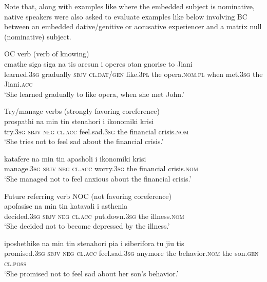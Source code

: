 \documentclass[output=paper]{langsci/langscibook}
\begin{document}
Note that, along with examples like  where the embedded subject is nominative, native speakers were also asked to evaluate examples like  below involving BC between an embedded dative\slash genitive or accusative experiencer and a matrix null (nominative) subject.\pagebreak

\ea%
    \label{ex:alexiadou:15}
OC verb (verb of knowing)\\
\ea \gll emathe {siga siga} na   tis aresun i operes otan   gnorise   to Jiani\\
learned.\textsc{3sg} gradually \textsc{sbjv} \textsc{cl.dat\slash gen} like.\textsc{3pl} the opera.\textsc{nom.pl} when met.\textsc{3sg} the Jiani.\textsc{acc}\\
\glt ‘She learned gradually to like opera, when she met John.’

Try\slash manage verbs (strongly favoring coreference)\\

\ex \gll  prospathi   na   min   tin   stenahori   i ikonomiki krisi \\
    try.\textsc{3sg} \textsc{sbjv}  \textsc{neg}  \textsc{cl.acc} feel.sad.\textsc{3sg}  the financial crisis.\textsc{nom}\\
    \glt ‘She tries not to feel sad about the financial crisis.’

\ex\gll  katafere   na   min   tin   apasholi    i ikonomiki krisi\\
    manage.\textsc{3sg} \textsc{sbjv}  \textsc{neg}  \textsc{cl.acc} worry.\textsc{3sg} the financial crisis.\textsc{nom}\\
    \glt ‘She managed not to feel anxious about the financial crisis.’

Future referring verb NOC (not favoring coreference)  \\

\ex \gll apofasise   na   min   tin   katavali   i asthenia\\
         decided.\textsc{3sg} \textsc{sbjv}  \textsc{neg} \textsc{cl.acc}   put.down.\textsc{3sg} the illness.\textsc{nom}\\
    \glt ‘She decided not to become depressed by the illness.’

\ex \gll iposhethike   na min   tin   stenahori   pia i   siberifora    tu   jiu    tis \\
         promised.\textsc{3sg} \textsc{sbjv}  \textsc{neg}   \textsc{cl.acc}  feel.sad.\textsc{3sg} anymore the   behavior.\textsc{nom}  the    son.\textsc{gen}   \textsc{cl.poss}\\
    \glt ‘She promised not to feel sad about her son’s behavior.’
\z
\z
\end{document}
